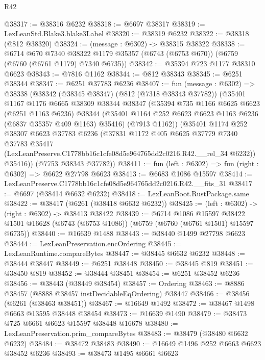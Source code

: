 \begin{lexlean}{R42}
\begin{coremodule}
{@38317 := @38316 @6232
@38318 := @6697 @38317
@38319 := LexLeanStd.Blake3.blake3Label
@38320 := @38319 @6232
@38322 := @38318 (@812 @38320)
@38324 := (message : @6302) -> @38315 @38322
@38338 := @6714
    @670
    @7340
    @38322
    @1179
    @35357
    (@6743 (@6753 @670))
    (@6759 (@6760 (@6761 @1179) @7340 @6735))
@38342 := @35394 @723 @1177 @38310 @6623
@38343 := @7816 @1162
@38344 := @812 @38343
@38345 := @6251 @38344
@38347 := @6251 @37783 @6236
@38407 := fun (message : @6302) =>
  @38338
    (@38342
      (@38345 @38347)
      (@812 (@7318 @38343 @37782))
      (@35401
        @1167
        @1176
        @6665
        @38309
        @38344
        @38347
        (@35394
          @735
          @1166
          @6625
          @6623
          (@6251 @1163 @6236)
          @38344
          (@35401 @1164 @252 @6623 @6623 @1163 @6236 (@6837 @35357 @409 @1163) @35416)
          (@7913 @1162))
        (@35401
          @1174
          @252
          @38307
          @6623
          @37783
          @6236
          (@37831
            @1172
            @405
            @6625
            @37779
            @7340
            @37783
            @35417
            (LexLeanPreserve.C1778bb16c1cfe08d5e964765dd2c0216.R42.__rel_34 @6232))
          @35416))
      (@7753 @38343 @37782))
@38411 := fun (left : @6302) => fun (right : @6302) => @6622 @27798 @6623
@38413 := @6683 @1086 @15597
@38414 := LexLeanPreserve.C1778bb16c1cfe08d5e964765dd2c0216.R42.__fits_31
@38417 := @6697 (@38414 @6632 @6232)
@38418 := LexLeanBoot.RustPackage.same
@38422 := @38417 (@6261 (@38418 @6632 @6232))
@38425 := (left : @6302) -> (right : @6302) -> @38413 @38422
@38439 := @6714
    @1086
    @15597
    @38422
    @1501
    @16628
    (@6743 (@6753 @1086))
    (@6759 (@6760 (@6761 @1501) @15597 @6735))
@38440 := @16639 @1488
@38443 := @38440 @1499 @27798 @6623
@38444 := LexLeanPreservation.encOrdering
@38445 := LexLeanRuntime.compareBytes
@38447 := @38445 @6632 @6232
@38448 := @38444 @38447
@38449 := @6251 @38448
@38450 := @38445 @819
@38451 := @38450 @819
@38452 := @38444 @38451
@38454 := @6251 @38452 @6236
@38456 := @38443 (@38449 @38454)
@38457 := Ordering
@38463 := @8886 @38457 (@8888 @38457 instDecidableEqOrdering) @38447
@38466 := @38456 (@6261 (@38463 @38451))
@38467 := @16649 @1492
@38472 := @38467 @1498 @6663 @13595 @38448 @38454
@38473 := @16639 @1490
@38479 := @38473 @725 @6661 @6623 @15597 @38448 @16678
@38480 := LexLeanPreservation.prim_compareBytes
@38483 := @38479 (@38480 @6632 @6232)
@38484 := @38472 @38483
@38490 := @16649 @1496 @252 @6663 @6623 @38452 @6236
@38493 := @38473 @1495 @6661 @6623
}
\end{coremodule}
\end{lexlean}
